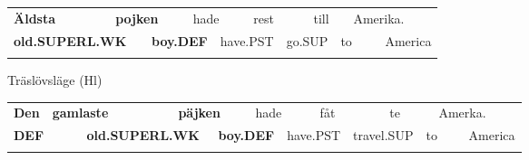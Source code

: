 \begin{tabular}{llllllllllll}
\lsptoprule
{\bfseries Äldsta} & \multicolumn{2}{l}{{\bfseries pojken}

} & \multicolumn{2}{l}{hade

} & \multicolumn{2}{l}{rest

} & \multicolumn{2}{l}{till

} & \multicolumn{2}{l}{Amerika.

} & \\
\multicolumn{2}{l}{{\bfseries old.SUPERL.WK}

} & \multicolumn{2}{l}{{\bfseries boy.DEF}

} & \multicolumn{2}{l}{have.PST

} & \multicolumn{2}{l}{go.SUP

} & \multicolumn{2}{l}{to

} & \multicolumn{2}{l}{America

}\\
\lspbottomrule
\end{tabular}

\begin{styleExLtrTblii}
Träslövsläge (Hl)

\end{styleExLtrTblii}

\begin{tabular}{llllllllllllll}
\lsptoprule
{\bfseries Den} & \multicolumn{2}{l}{{\bfseries gamlaste}

} & \multicolumn{2}{l}{{\bfseries päjken}

} & \multicolumn{2}{l}{hade

} & \multicolumn{2}{l}{fåt

} & \multicolumn{2}{l}{te

} & \multicolumn{2}{l}{Amerka.

} & \\
\multicolumn{2}{l}{{\bfseries DEF}

} & \multicolumn{2}{l}{{\bfseries old.SUPERL.WK}

} & \multicolumn{2}{l}{{\bfseries boy.DEF}

} & \multicolumn{2}{l}{have.PST

} & \multicolumn{2}{l}{travel.SUP

} & \multicolumn{2}{l}{to

} & \multicolumn{2}{l}{America

}\\
\lspbottomrule
\end{tabular}

